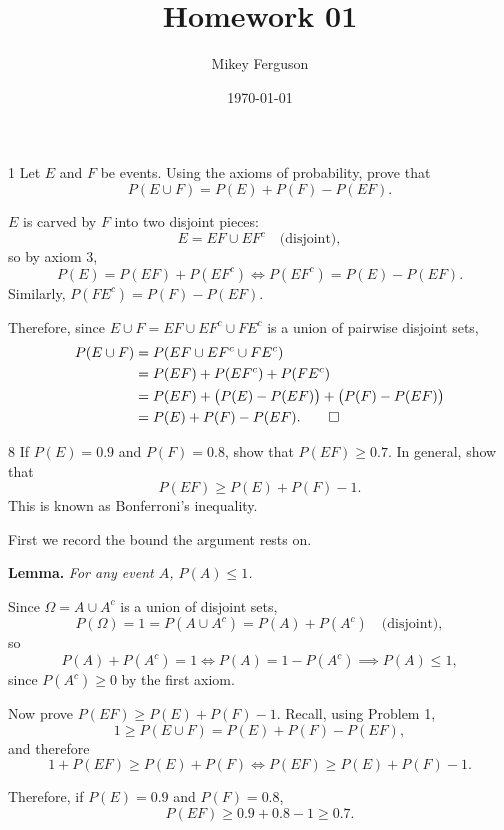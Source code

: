 \documentclass[11pt]{article}
\title{Homework 01}
\author{Mikey Ferguson}
\date{\today}
\begin{document}
\maketitle

\begin{problem}{1}
  Let $E$ and $F$ be events. Using the axioms of probability, prove that
  \[
    P(E \cup F) = P(E) + P(F) - P(EF).
  \]
\end{problem}
$E$ is carved by $F$ into two disjoint pieces:
\[
  E = EF \cup EF^{c} \quad \text{(disjoint)},
\]
so by axiom 3,
\[
  P(E) = P(EF) + P(EF^{c})
  \iff
  P(EF^{c}) = P(E) - P(EF).
\]
Similarly, $P(FE^{c}) = P(F) - P(EF)$.

Therefore, since $E \cup F = EF \cup EF^{c} \cup FE^{c}$ is a union of pairwise
disjoint sets,
\begin{align*}
  P(E \cup F)
    &= P\!\left(EF \cup EF^{c} \cup FE^{c}\right) \\
    &= P(EF) + P(EF^{c}) + P(FE^{c}) \\
    &= P(EF) + \bigl(P(E) - P(EF)\bigr) + \bigl(P(F) - P(EF)\bigr) \\
    &= P(E) + P(F) - P(EF). \qedhere
\end{align*}

\begin{problem}{8}
  If $P(E) = 0.9$ and $P(F) = 0.8$, show that $P(EF) \geqslant 0.7$. In general,
  show that
  \[
    P(EF) \geqslant P(E) + P(F) - 1.
  \]
  This is known as Bonferroni's inequality.
\end{problem}
First we record the bound the argument rests on.

\medskip
\noindent\textbf{Lemma.} \emph{For any event $A$, $P(A) \leqslant 1$.}

\smallskip
\noindent Since $\Omega = A \cup A^{c}$ is a union of disjoint sets,
\[
  P(\Omega) = 1 = P(A \cup A^{c}) = P(A) + P(A^{c})
  \quad \text{(disjoint)},
\]
so
\[
  P(A) + P(A^{c}) = 1
  \iff
  P(A) = 1 - P(A^{c})
  \implies
  P(A) \leqslant 1,
\]
since $P(A^{c}) \geqslant 0$ by the first axiom.

\medskip
\noindent Now prove $P(EF) \geqslant P(E) + P(F) - 1$. Recall, using Problem 1,
\[
  1 \geqslant P(E \cup F) = P(E) + P(F) - P(EF),
\]
and therefore
\[
  1 + P(EF) \geqslant P(E) + P(F)
  \iff
  P(EF) \geqslant P(E) + P(F) - 1 .
\]

Therefore, if $P(E) = 0.9$ and $P(F) = 0.8$,
\[
  P(EF) \geqslant 0.9 + 0.8 - 1 \geqslant 0.7 .
\]
\end{document}
